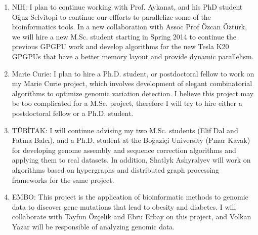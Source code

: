 \begin{enumerate}
\begin{enumerate}
\item NIH: I plan to continue working with Prof. Aykanat, and his PhD student Oğuz Selvitopi to continue our effforts to parallelize some of the bioinformatics tools. In a new collaboration with Assoc Prof Özcan Öztürk, we will hire a new M.Sc. student starting in Spring 2014 to continue the previous GPGPU work and develop algorithms for the new Tesla K20 GPGPUs that have a better memory layout and provide dynamic parallelism.
\item Marie Curie: I plan to hire a Ph.D. student, or postdoctoral fellow to work on my Marie Curie project, which involves development of elegant combinatorial algorithms to optimize genomic variation detection. I believe this project may be too complicated for a M.Sc. project, therefore I will try to hire either a postdoctoral fellow or a Ph.D. student.
\item TÜBİTAK: I will continue advising my two M.Sc. students (Elif Dal and Fatma Balcı), and a Ph.D. student at the Boğaziçi University (Pınar Kavak) for developing genome assembly and sequence correction algorithms and applying them to real datasets. In addition, Shatlyk Ashyralyev will work on algorithms based on hypergraphs and distributed graph processing frameworks for the same project.
\item EMBO: This project is the application of bioinformatic methods to genomic data to discover gene 	  mutations that lead to obesity and diabetes. I will collaborate with Tayfun Özçelik and Ebru Erbay on   	  this project, and Volkan Yazar will be responsible of analyzing genomic data.

\end{enumerate}

\end{enumerate}

